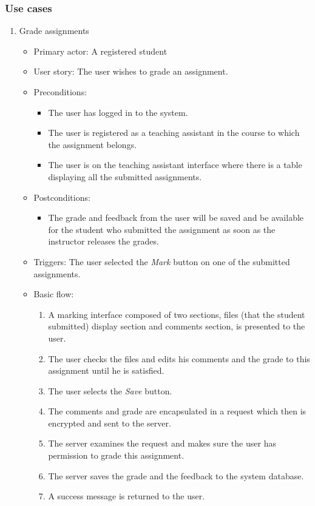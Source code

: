 \subsubsection{Use cases}
\begin{enumerate}
\item Grade assignments
\begin{itemize}
    \item Primary actor: A registered student
    \item User story: The user wishes to grade an assignment.
    \item Preconditions:
        \begin{itemize}
            \item The user has logged in to the system.
            \item The user is registered as a teaching assistant in the course
                to which the assignment belongs.
            \item The user is on the teaching assistant interface where there
                is a table displaying all the submitted assignments.
        \end{itemize}
    \item Postconditions:
        \begin{itemize}
            \item The grade and feedback from the user will be saved and be
                available for the student who submitted the assignment as soon
                as the instructor releases the grades.
        \end{itemize}
    \item Triggers:
        The user selected the \emph{Mark} button on one of the submitted
        assignments.
    \item Basic flow:
        \begin{enumerate}
            \item A marking interface composed of two sections, 
                files (that the student submitted) display section and
                comments section, is presented to the user.
            \item The user checks the files and edits his comments and the
                grade to this assignment until he is satisfied.
            \item The user selects the \emph{Save} button.
            \item The comments and grade are encapsulated in a request which
                then is encrypted and sent to the server.
            \item The server examines the request and makes sure the user has
                permission to grade this assignment.
            \item The server saves the grade and the feedback to the system
                database.
            \item A success message is returned to the user.
        \end{enumerate}
\end{itemize}
\end{enumerate}

